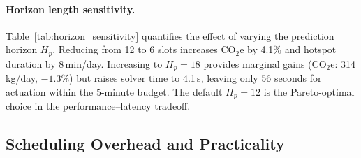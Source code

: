 \documentclass[a4paper,fleqn]{cas-dc}
\begin{document}
\paragraph{Horizon length sensitivity.}
Table~\ref{tab:horizon_sensitivity} quantifies the effect of varying the prediction horizon $H_p$. Reducing from 12 to 6 slots increases CO$_2$e by 4.1\% and hotspot duration by 8\,min/day. Increasing to $H_p=18$ provides marginal gains (CO$_2$e: 314\,kg/day, $-1.3\%$) but raises solver time to 4.1\,s, leaving only 56 seconds for actuation within the 5-minute budget. The default $H_p=12$ is the Pareto-optimal choice in the performance--latency tradeoff.

\begin{table}[!htb]
\centering
\caption{Horizon length sensitivity. Increasing $H_p$ beyond 12 slots yields diminishing returns in sustainability while approaching the solver time budget.}
\label{tab:horizon_sensitivity}
\setlength{\tabcolsep}{6pt}
\renewcommand{\arraystretch}{1.3}
\scriptsize
{}%
\end{table}
\subsection{Scheduling Overhead and Practicality}
\label{sec:overhead}
\end{document}
